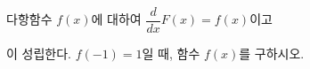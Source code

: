 다항함수 $f(x)$에 대하여 $\dfrac{d}{dx}F(x)=f(x)$이고\par\smallskip{}\par\smallskip\noindent 이 성립한다. $f(-1)=1$일 때, 함수 $f(x)$를 구하시오.
